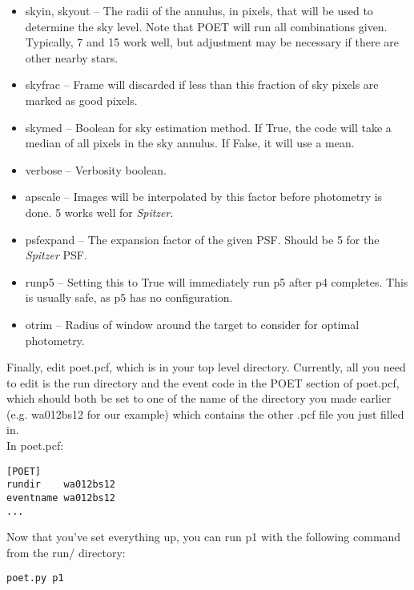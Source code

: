 \documentclass[letterpaper,12pt]{article}
\begin{document}
\begin{itemize}
\item skyin, skyout -- The radii of the annulus, in pixels, that will
  be used to determine the sky level. Note that POET will run all
  combinations given. Typically, 7 and 15 work well, but adjustment
  may be necessary if there are other nearby stars.

\item skyfrac -- Frame will discarded if less than this fraction of
  sky pixels are marked as good pixels.

\item skymed -- Boolean for sky estimation method. If True, the code will
  take a median of all pixels in the sky annulus. If False, it will use
  a mean.

\item verbose -- Verbosity boolean.

\item apscale -- Images will be interpolated by this factor before
  photometry is done. 5 works well for \textit{Spitzer}.

\item psfexpand -- The expansion factor of the given PSF. Should be 5
  for the \textit{Spitzer} PSF.

\item runp5 -- Setting this to True will immediately run p5 after p4
  completes. This is usually safe, as p5 has no configuration.

\item otrim -- Radius of window around the target to consider for optimal
  photometry.
\end{itemize}


Finally, edit poet.pcf, which is in your top level
directory. Currently, all you need to edit is the run directory and
the event code in the POET section of poet.pcf, which should both be
set to one of the name of the directory you made earlier
(e.g. wa012bs12 for our example) which contains the other .pcf file
you just filled in.
\\In poet.pcf:\\
\begin{verbatim}
[POET]
rundir    wa012bs12
eventname wa012bs12
...
\end{verbatim}

Now that you've set everything up, you can run p1 with the following
command from the run/ directory:

\begin{verbatim}
poet.py p1
\end{verbatim}
\end{document}
